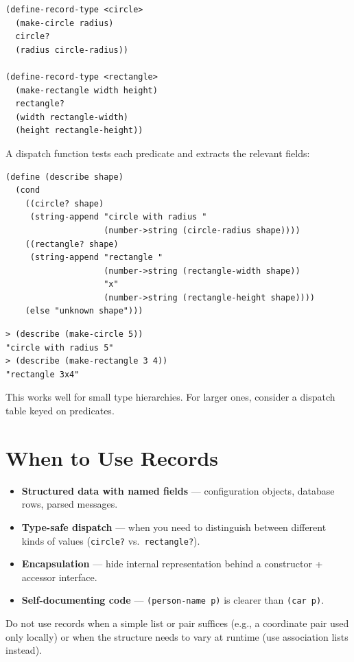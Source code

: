 \begin{lstlisting}
(define-record-type <circle>
  (make-circle radius)
  circle?
  (radius circle-radius))

(define-record-type <rectangle>
  (make-rectangle width height)
  rectangle?
  (width rectangle-width)
  (height rectangle-height))
\end{lstlisting}

A dispatch function tests each predicate and extracts the relevant fields:

\begin{lstlisting}
(define (describe shape)
  (cond
    ((circle? shape)
     (string-append "circle with radius "
                    (number->string (circle-radius shape))))
    ((rectangle? shape)
     (string-append "rectangle "
                    (number->string (rectangle-width shape))
                    "x"
                    (number->string (rectangle-height shape))))
    (else "unknown shape")))
\end{lstlisting}

\begin{lstlisting}[style=repl]
> (describe (make-circle 5))
"circle with radius 5"
> (describe (make-rectangle 3 4))
"rectangle 3x4"
\end{lstlisting}

This works well for small type hierarchies. For larger ones, consider a dispatch table keyed on predicates.

\section{When to Use Records}

\begin{itemize}
    \item \textbf{Structured data with named fields} --- configuration objects, database rows, parsed messages.
    \item \textbf{Type-safe dispatch} --- when you need to distinguish between different kinds of values (\texttt{circle?} vs.\ \texttt{rectangle?}).
    \item \textbf{Encapsulation} --- hide internal representation behind a constructor + accessor interface.
    \item \textbf{Self-documenting code} --- \texttt{(person-name p)} is clearer than \texttt{(car p)}.
\end{itemize}

Do not use records when a simple list or pair suffices (e.g., a coordinate pair used only locally) or when the structure needs to vary at runtime (use association lists instead).

